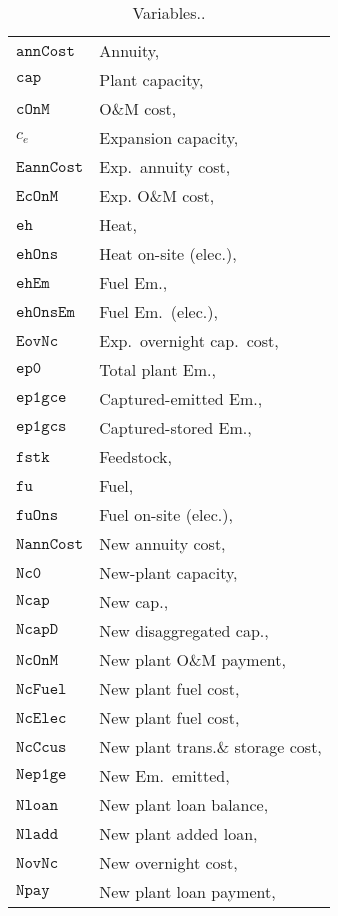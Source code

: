 \documentclass{amsbook}
\begin{document}
\begin{longtable}[c]{@{}ll@{}}
 \caption{Variables.\label{tab:vars}.}\\
    $\mathtt{annCost}$	& Annuity, \\
    $\mathtt{cap}$	& Plant capacity, \\
    $\mathtt{cOnM}$	& O\&M cost, \\
    $c_e$	& Expansion capacity, \\
    $\mathtt{EannCost}$ & Exp.\ annuity cost, \\
    $\mathtt{EcOnM}$ & Exp. O\&M cost, \\
    $\mathtt{eh}$	& Heat, \\
    $\mathtt{ehOns}$	& Heat on-site (elec.), \\
    $\mathtt{ehEm}$	& Fuel Em., \\
    $\mathtt{ehOnsEm}$	& Fuel Em.\ (elec.), \\
    $\mathtt{EovNc}$ & Exp.\ overnight cap.\ cost, \\
    $\mathtt{ep0}$	& Total plant Em., \\
    $\mathtt{ep1gce}$	& Captured-emitted Em., \\
    $\mathtt{ep1gcs}$	& Captured-stored Em., \\
    $\mathtt{fstk}$	& Feedstock, \\
    $\mathtt{fu}$	& Fuel, \\
    $\mathtt{fuOns}$	& Fuel on-site (elec.), \\
    $\mathtt{NannCost}$ & New annuity cost, \\
    $\mathtt{Nc0}$	& New-plant capacity, \\
    $\mathtt{Ncap}$ & New cap., \\
    $\mathtt{NcapD}$ & New disaggregated cap., \\
    $\mathtt{NcOnM}$ & New plant O\&M payment, \\
    $\mathtt{NcFuel}$ & New plant fuel cost, \\
    $\mathtt{NcElec}$ & New plant fuel cost, \\
    $\mathtt{NcCcus}$ & New plant trans.\& storage cost, \\
    $\mathtt{Nep1ge}$ & New Em.\ emitted, \\
    $\mathtt{Nloan}$	& New plant loan balance, \\
    $\mathtt{Nladd}$	& New plant added loan, \\
    $\mathtt{NovNc}$ & New overnight cost, \\
    $\mathtt{Npay}$	& New plant loan payment, \\

\end{longtable}
\end{document}
